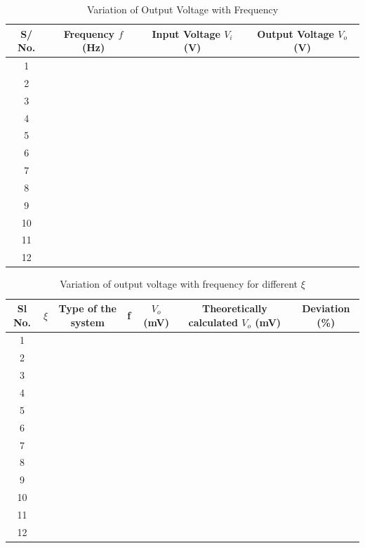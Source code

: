 \documentclass[9pt]{scrreprt}
\begin{document}
\begin{table}[h!]
\centering
\caption{Variation of Output Voltage with Frequency}
\begin{tabular}{|c|c|c|c|}
\hline
\textbf{S/ No.} & \textbf{Frequency $f$ (Hz)} & \textbf{Input Voltage $V_i$ (V)} & \textbf{Output Voltage $V_o$ (V)} \\ \hline
1 &  &  &  \\ \hline
2 &  &  &  \\ \hline
3 &  &  &  \\ \hline
4 &  &  &  \\ \hline
5 &  &  &  \\ \hline
6 &  &  &  \\ \hline
7 &  &  &  \\ \hline
8 &  &  &  \\ \hline
9 &  &  &  \\ \hline
10 &  &  &  \\ \hline
11 &  &  &  \\ \hline
12 &  &  &  \\ \hline
\end{tabular}
\label{tab:OP_vs_freq}
\end{table}

\begin{table}[H]
\centering
\begin{tabular}{|c|c|c|c|c|c|c|}
\hline
\textbf{Sl No.} & \textbf{$\xi$} & \textbf{Type of the system} & \textbf{f} & \textbf{$V_o$ (mV)} & \textbf{Theoretically calculated $V_o$ (mV)} & \textbf{Deviation (\%)} \\ \hline
1  &   &   &   &   &   &   \\ \hline
2  &   &   &   &   &   &   \\ \hline
3  &   &   &   &   &   &   \\ \hline
4  &   &   &   &   &   &   \\ \hline
5  &   &   &   &   &   &   \\ \hline
6  &   &   &   &   &   &   \\ \hline
7  &   &   &   &   &   &   \\ \hline
8  &   &   &   &   &   &   \\ \hline
9  &   &   &   &   &   &   \\ \hline
10 &   &   &   &   &   &   \\ \hline
11 &   &   &   &   &   &   \\ \hline
12 &   &   &   &   &   &   \\ \hline
\end{tabular}
\caption{Variation of output voltage with frequency for different $\xi$}
\end{table}
\end{document}
